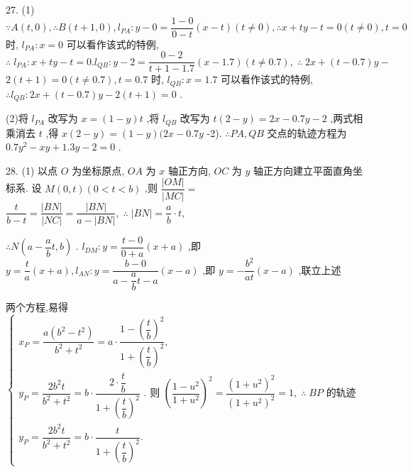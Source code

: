 27. (1) $\because A\left( {t,0}\right) ,\therefore B\left( {t + 1,0}\right) ,{l}_{PA} : y - 0 = \dfrac{1 - 0}{0 - t}\left( {x - t}\right) \left( {t \neq  0}\right) ,\therefore x + {ty} - t = 0\left( {t \neq  0}\right) ,t = 0$ 时, ${l}_{PA} : x = 0$ 可以看作该式的特例, $\therefore \;{l}_{PA} : x + {ty} - t = 0.{l}_{QB} : y - 2 = \dfrac{0 - 2}{t + 1 - {1.7}}\left( {x - {1.7}}\right) \left( {t \neq  {0.7}}\right) ,\;\therefore \;{2x} + \left( {t - {0.7}}\right) y -$  $2\left( {t + 1}\right)  = 0\left( {t \neq  {0.7}}\right) ,t = {0.7}$ 时, ${l}_{QB} : x = {1.7}$ 可以看作该式的特例, $\therefore {l}_{QB} : {2x} + \left( {t - {0.7}}\right) y - 2\left( {t + 1}\right)  = 0$ .

(2)将 ${l}_{PA}$ 改写为 $x = \left( {1 - y}\right) t$ ,将 ${l}_{QB}$ 改写为 $t\left( {2 - y}\right)  = {2x} - {0.7y} - 2$ ,两式相乘消去 $t$ ,得 $x\left( {2 - y}\right)  = \left( {1 - y}\right) ({2x} - {0.7y}$ -2). $\therefore {PA},{QB}$ 交点的轨迹方程为 ${0.7}{y}^{2} - {xy} + {1.3y} - 2 = 0$ .

28. (1) 以点 $O$ 为坐标原点, ${OA}$ 为 $x$ 轴正方向, ${OC}$ 为 $y$ 轴正方向建立平面直角坐标系. 设 $M\left( {0,t}\right) \left( {0 < t < b}\right)$ ,则 $\dfrac{\left| OM\right| }{\left| MC\right| } =$  $\dfrac{t}{b - t} = \dfrac{\left| BN\right| }{\left| NC\right| } = \dfrac{\left| BN\right| }{a - \left| {BN}\right| },\;\therefore \;\left| {BN}\right|  = \dfrac{a}{b} \cdot  t,$

$\therefore N\left( {a - \dfrac{a}{b}t,b}\right)$ . ${l}_{DM} : y = \dfrac{t - 0}{0 + a}\left( {x + a}\right)$ ,即 $y = \dfrac{t}{a}\left( {x + a}\right) ,{l}_{AN} : y = \dfrac{b - 0}{a - \dfrac{a}{b}t - a}\left( {x - a}\right)$ ,即 $y =  - \dfrac{{b}^{2}}{at}\left( {x - a}\right)$ ,联立上述

两个方程,易得 $\left\{  \begin{array}{l} {x}_{P} = \dfrac{a\left( {{b}^{2} - {t}^{2}}\right) }{{b}^{2} + {t}^{2}} = a \cdot  \dfrac{1 - {\left( \dfrac{t}{b}\right) }^{2}}{1 + {\left( \dfrac{t}{b}\right) }^{2}}, \\  {y}_{P} = \dfrac{2{b}^{2}t}{{b}^{2} + {t}^{2}} = b \cdot  \dfrac{2 \cdot  \dfrac{t}{b}}{1 + {\left( \dfrac{t}{b}\right) }^{2}}\text{ . 则 }{\left( \dfrac{1 - {u}^{2}}{1 + {u}^{2}}\right) }^{2} = \dfrac{{\left( 1 + {u}^{2}\right) }^{2}}{{\left( 1 + {u}^{2}\right) }^{2}} = 1,\;\therefore \;{BP}\text{ 的轨迹 } \\  {y}_{P} = \dfrac{2{b}^{2}t}{{b}^{2} + {t}^{2}} = b \cdot  \dfrac{t}{1 + {\left( \dfrac{t}{b}\right) }^{2}}. \end{array}\right.$

